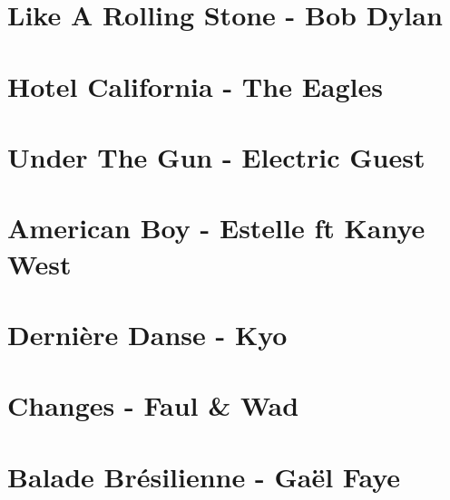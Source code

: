 \documentclass[11pt]{article}
\begin{document}
\section*{Like A Rolling Stone - Bob Dylan}
\begin{guitar}

\end{guitar}



\section{Hotel California - The Eagles}
\begin{guitar}

\end{guitar}

\section{Under The Gun - Electric Guest}
\begin{guitar}

\end{guitar}


\section{American Boy - Estelle ft Kanye West}


\section{Dernière Danse - Kyo}
\begin{guitar}

\end{guitar}


\section{Changes - Faul \& Wad}
\begin{guitar}

\end{guitar}

\section{Balade Brésilienne - Gaël Faye}
\begin{guitar}

\end{guitar}
\end{document}
